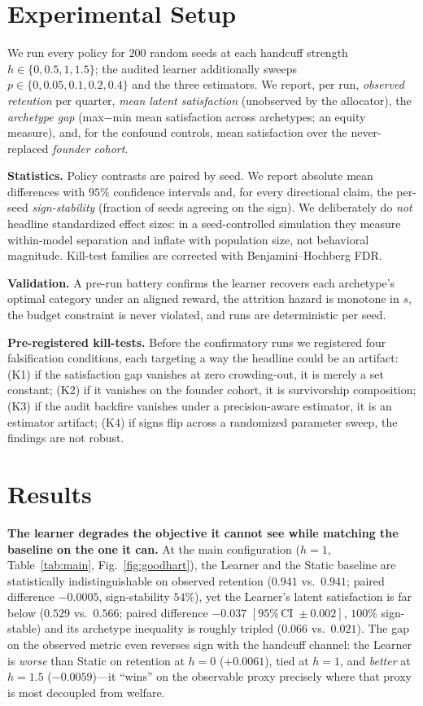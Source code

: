 \documentclass[11pt]{article}
\begin{document}
\section{Experimental Setup}
We run every policy for $200$ random seeds at each handcuff strength
$h\in\{0,0.5,1,1.5\}$; the audited learner additionally sweeps
$p\in\{0,0.05,0.1,0.2,0.4\}$ and the three estimators. We report, per run,
\emph{observed retention} per quarter, \emph{mean latent satisfaction}
(unobserved by the allocator), the \emph{archetype gap} (max$-$min mean
satisfaction across archetypes; an equity measure), and, for the confound
controls, mean satisfaction over the never-replaced \emph{founder cohort}.

\textbf{Statistics.} Policy contrasts are paired by seed. We report absolute
mean differences with $95\%$ confidence intervals and, for every directional
claim, the per-seed \emph{sign-stability} (fraction of seeds agreeing on the
sign). We deliberately do \emph{not} headline standardized effect sizes: in a
seed-controlled simulation they measure within-model separation and inflate with
population size, not behavioral magnitude. Kill-test families are corrected with
Benjamini--Hochberg FDR.

\textbf{Validation.} A pre-run battery confirms the learner recovers each
archetype's optimal category under an aligned reward, the attrition hazard is
monotone in $s$, the budget constraint is never violated, and runs are
deterministic per seed.

\textbf{Pre-registered kill-tests.} Before the confirmatory runs we registered
four falsification conditions, each targeting a way the headline could be an
artifact: (K1) if the satisfaction gap vanishes at zero crowding-out, it is
merely a set constant; (K2) if it vanishes on the founder cohort, it is
survivorship composition; (K3) if the audit backfire vanishes under a
precision-aware estimator, it is an estimator artifact; (K4) if signs flip
across a randomized parameter sweep, the findings are not robust.

\section{Results}\label{sec:results}
\textbf{The learner degrades the objective it cannot see while matching the
baseline on the one it can.} At the main configuration ($h{=}1$,
Table~\ref{tab:main}, Fig.~\ref{fig:goodhart}), the Learner and the Static
baseline are statistically indistinguishable on observed retention
($0.941$ vs.\ $0.941$; paired difference $-0.0005$, sign-stability $54\%$), yet
the Learner's latent satisfaction is far below ($0.529$ vs.\ $0.566$; paired
difference $-0.037$ $[95\%\,\text{CI}\;\pm0.002]$, $100\%$ sign-stable) and its
archetype inequality is roughly tripled ($0.066$ vs.\ $0.021$). The gap on the
observed metric even reverses sign with the handcuff channel: the Learner is
\emph{worse} than Static on retention at $h{=}0$ ($+0.0061$), tied at $h{=}1$,
and \emph{better} at $h{=}1.5$ ($-0.0059$)---it ``wins'' on the observable proxy
precisely where that proxy is most decoupled from welfare.
\end{document}
